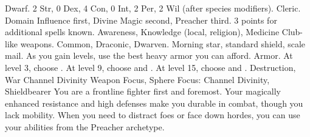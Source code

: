              Dwarf.
             2 Str, 0 Dex, 4 Con, 0 Int, 2 Per, 2 Wil (after species modifiers).
             Cleric.
             Domain Influence first, Divine Magic second, Preacher third.
             3 points for additional spells known.
             Awareness, Knowledge (local, religion), Medicine
             Club-like weapons.
             Common, Draconic, Dwarven.
             Morning star, standard shield, scale mail. As you gain levels, use the best heavy armor you can afford.
             Armor.
                At level 3, choose .
                At level 9, choose  and .
                At level 15, choose  and .
             Destruction, War
             Channel Divinity
             Weapon Focus, Sphere Focus: Channel Divinity, Shieldbearer
             You are a frontline fighter first and foremost.
            Your magically enhanced resistance and high defenses make you durable in combat, though you lack mobility. 
            When you need to distract foes or face down hordes, you can use your abilities from the Preacher archetype.

